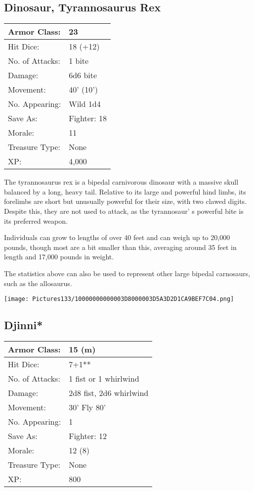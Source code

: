 \documentclass[a4paper,twoside,openany,10pt]{book}
\begin{document}
\begin{multicols}{2}
\subsection*{Dinosaur, Tyrannosaurus Rex}\label{dinosaur-tyrannosaurus-rex}


\begin{tabularx}{0.48\textwidth}{@{}lX@{}}
Armor Class: & 23 \\\hline
Hit Dice: & 18 (+12) \\\hline
No. of Attacks: & 1 bite \\\hline
Damage: & 6d6 bite \\\hline
Movement: & 40' (10') \\\hline
No. Appearing: & Wild 1d4 \\\hline
Save As: & Fighter: 18 \\\hline
Morale: & 11 \\\hline
Treasure Type: & None \\\hline
XP: & 4,000 \\\hline
\end{tabularx}\medskip

The tyrannosaurus rex is a bipedal carnivorous dinosaur with a massive skull balanced by a long, heavy tail. Relative to its large and powerful hind limbs, its forelimbs are short but unusually powerful for their size, with two clawed digits. Despite this, they are not used to attack, as the tyrannosaur' s powerful bite is its preferred weapon.

Individuals can grow to lengths of over 40 feet and can weigh up to 20,000 pounds, though most are a bit smaller than this, averaging around 35 feet in length and 17,000 pounds in weight.

The statistics above can also be used to represent other large bipedal carnosaurs, such as the allosaurus.

\begin{center}
	\texttt{[image: Pictures133/10000000000003D8000003D5A3D2D1CA9BEF7C04.png]}
\end{center}

\subsection*{Djinni*}\label{djinni}


\begin{tabularx}{0.48\textwidth}{@{}lX@{}}
Armor Class: & 15 (m) \\\hline
Hit Dice: & 7+1** \\\hline
No. of Attacks: & 1 fist or 1 whirlwind \\\hline
Damage: & 2d8 fist, 2d6 whirlwind \\\hline
Movement: & 30' Fly 80' \\\hline
No. Appearing: & 1 \\\hline
Save As: & Fighter: 12 \\\hline
Morale: & 12 (8) \\\hline
Treasure Type: & None \\\hline
XP: & 800 \\\hline
\end{tabularx}\medskip


\end{multicols}
\end{document}

